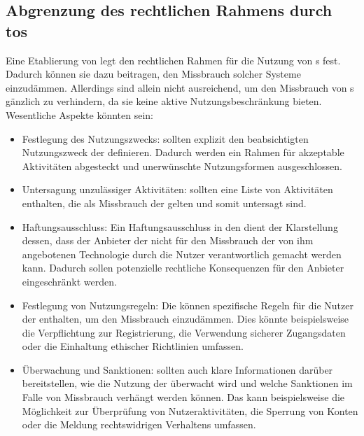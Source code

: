 \documentclass[hidelinks,12pt]{report}
\begin{document}
\subsection{Abgrenzung des rechtlichen Rahmens durch \Gls{tos}}
Eine Etablierung von  legt den rechtlichen Rahmen für die Nutzung von s fest. Dadurch können sie dazu beitragen, den Missbrauch solcher Systeme einzudämmen. Allerdings sind  allein nicht ausreichend, um den Missbrauch von s gänzlich zu verhindern, da sie keine aktive Nutzungsbeschränkung bieten. Wesentliche Aspekte könnten sein:\\

\begin{itemize}
	\item Festlegung des Nutzungszwecks:  sollten explizit den beabsichtigten Nutzungszweck der  definieren. Dadurch werden ein Rahmen für akzeptable Aktivitäten abgesteckt und unerwünschte Nutzungsformen ausgeschlossen.
	\item Untersagung unzulässiger Aktivitäten:  sollten eine Liste von Aktivitäten enthalten, die als Missbrauch der  gelten und somit untersagt sind.
	\item Haftungsausschluss: Ein Haftungsausschluss in den  dient der Klarstellung dessen, dass der Anbieter der  nicht für den Missbrauch der von ihm angebotenen Technologie durch die Nutzer verantwortlich gemacht werden kann. Dadurch sollen potenzielle rechtliche Konsequenzen für den Anbieter eingeschränkt werden.
	\item Festlegung von Nutzungsregeln: Die   können spezifische Regeln für die Nutzer der  enthalten, um den Missbrauch einzudämmen. Dies könnte beispielsweise die Verpflichtung zur Registrierung, die Verwendung sicherer Zugangsdaten oder die Einhaltung ethischer Richtlinien umfassen.
	\item Überwachung und Sanktionen:  sollten auch klare Informationen darüber bereitstellen, wie die Nutzung der  überwacht wird und welche Sanktionen im Falle von Missbrauch verhängt werden können. Das kann beispielsweise die Möglichkeit zur Überprüfung von Nutzeraktivitäten, die Sperrung von Konten oder die Meldung rechtswidrigen Verhaltens umfassen.
\end{itemize}

\newpage
\end{document}
